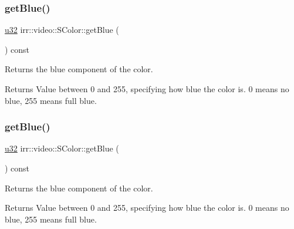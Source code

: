 \subsubsection{\texorpdfstring{get\+Blue()}{getBlue()}\hspace{0.1cm}{\footnotesize\ttfamily [1/2]}}
{\footnotesize\ttfamily \hyperlink{namespaceirr_a0416a53257075833e7002efd0a18e804}{u32} irr\+::video\+::\+S\+Color\+::get\+Blue (\begin{DoxyParamCaption}{ }\end{DoxyParamCaption}) const\hspace{0.3cm}{\ttfamily [inline]}}



Returns the blue component of the color. 

\begin{DoxyReturn}{Returns}
Value between 0 and 255, specifying how blue the color is. 0 means no blue, 255 means full blue. 
\end{DoxyReturn}
\mbox{\label{classirr_1_1video_1_1SColor_afb60ac456b2efc2f2a4f04a643293d26}} 
\subsubsection{\texorpdfstring{get\+Blue()}{getBlue()}\hspace{0.1cm}{\footnotesize\ttfamily [2/2]}}
{\footnotesize\ttfamily \hyperlink{namespaceirr_a0416a53257075833e7002efd0a18e804}{u32} irr\+::video\+::\+S\+Color\+::get\+Blue (\begin{DoxyParamCaption}{ }\end{DoxyParamCaption}) const\hspace{0.3cm}{\ttfamily [inline]}}



Returns the blue component of the color. 

\begin{DoxyReturn}{Returns}
Value between 0 and 255, specifying how blue the color is. 0 means no blue, 255 means full blue. 
\end{DoxyReturn}
\mbox{\label{classirr_1_1video_1_1SColor_a7cba1b914230289de9c91ff28be96bc9}} 
